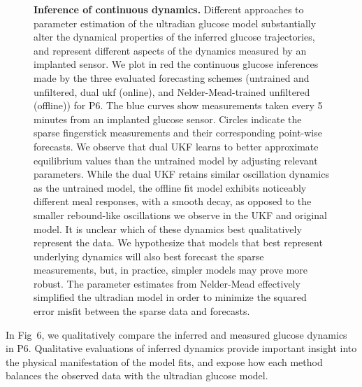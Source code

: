 \documentclass[10pt,letterpaper]{article}
\begin{document}
\begin{figure}[!h]
  \centering
  \begin{adjustwidth}{-2.25in}{0in} %
  \caption{{\bf Inference of continuous dynamics.}
  Different approaches to parameter estimation of the ultradian glucose model substantially alter the dynamical properties of the inferred glucose trajectories, and represent different aspects of the dynamics measured by an implanted sensor. We plot in red the continuous glucose inferences made by the three evaluated forecasting schemes (untrained and unfiltered, dual ukf (online), and Nelder-Mead-trained unfiltered (offline)) for P6. The blue curves show measurements taken every 5 minutes from an implanted glucose sensor. Circles indicate the sparse fingerstick measurements and their corresponding point-wise forecasts. We observe that dual UKF learns to better approximate equilibrium values than the untrained model by adjusting relevant parameters. While the dual UKF retains similar oscillation dynamics as the untrained model, the offline fit model exhibits noticeably different meal responses, with a smooth decay, as opposed to the smaller rebound-like oscillations we observe in the UKF and original model. It is unclear which of these dynamics best qualitatively represent the data. We hypothesize that models that best represent underlying dynamics will also best forecast the sparse measurements, but, in practice, simpler models may prove more robust. The parameter estimates from Nelder-Mead effectively simplified the ultradian model in order to minimize the squared error misfit between the sparse data and forecasts.}
  \label{fig:curves}
  \end{adjustwidth}
\end{figure}

In Fig~6, we qualitatively compare the inferred and measured glucose dynamics in P6. Qualitative evaluations of inferred dynamics provide important insight into the physical manifestation of the model fits, and expose how each method balances the observed data with the ultradian glucose model.
\end{document}
